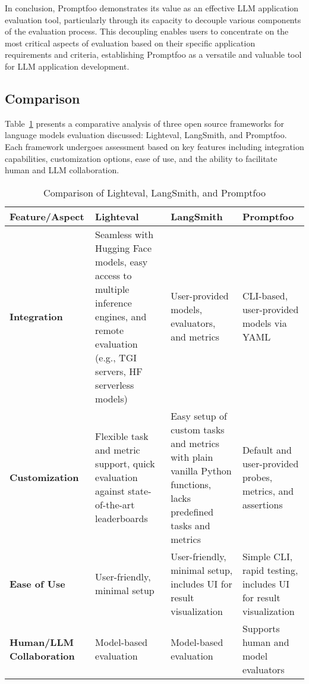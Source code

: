 In conclusion, Promptfoo demonstrates its value as an effective LLM application evaluation tool, particularly through its capacity to decouple various components of the evaluation process. This decoupling enables users to concentrate on the most critical aspects of evaluation based on their specific application requirements and criteria, establishing Promptfoo as a versatile and valuable tool for LLM application development.

\subsection{Comparison}

Table~\ref{tab:tool-comparison} presents a comparative analysis of three open source frameworks for language models evaluation discussed: Lighteval, LangSmith, and Promptfoo. Each framework undergoes assessment based on key features including integration capabilities, customization options, ease of use, and the ability to facilitate human and LLM collaboration.
\begin{table}[h]
\centering
\begin{tabular}{lp{3cm}p{3cm}p{3cm}}
\hline
\textbf{Feature/Aspect} & \textbf{Lighteval} & \textbf{LangSmith} & \textbf{Promptfoo} \\
\hline
\textbf{Integration} & Seamless with Hugging Face models, easy access to multiple inference engines, and remote evaluation (e.g., TGI servers, HF serverless models) & User-provided models, evaluators, and metrics & CLI-based, user-provided models via YAML \\
\hline
\textbf{Customization} & Flexible task and metric support, quick evaluation against state-of-the-art leaderboards & Easy setup of custom tasks and metrics with plain vanilla Python functions, lacks predefined tasks and metrics & Default and user-provided probes, metrics, and assertions \\
\hline
\textbf{Ease of Use} & User-friendly, minimal setup & User-friendly, minimal setup, includes UI for result visualization & Simple CLI, rapid testing, includes UI for result visualization \\
\hline
\textbf{Human/LLM Collaboration} & Model-based evaluation & Model-based evaluation & Supports human and model evaluators \\
\hline
\end{tabular}
\caption{Comparison of Lighteval, LangSmith, and Promptfoo}
\label{tab:tool-comparison}
\end{table}

